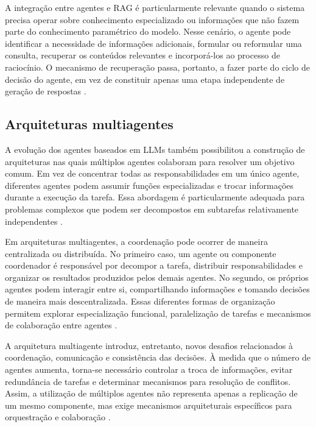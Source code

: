 A integração entre agentes e RAG é particularmente relevante quando o sistema precisa operar sobre conhecimento especializado ou informações que não fazem parte do conhecimento paramétrico do modelo. Nesse cenário, o agente pode identificar a necessidade de informações adicionais, formular ou reformular uma consulta, recuperar os conteúdos relevantes e incorporá-los ao processo de raciocínio. O mecanismo de recuperação passa, portanto, a fazer parte do ciclo de decisão do agente, em vez de constituir apenas uma etapa independente de geração de respostas \cite{lewis2020rag,zhao2026survey}.

\subsection{Arquiteturas multiagentes}

A evolução dos agentes baseados em LLMs também possibilitou a construção de arquiteturas nas quais múltiplos agentes colaboram para resolver um objetivo comum. Em vez de concentrar todas as responsabilidades em um único agente, diferentes agentes podem assumir funções especializadas e trocar informações durante a execução da tarefa. Essa abordagem é particularmente adequada para problemas complexos que podem ser decompostos em subtarefas relativamente independentes \cite{cheng2026,zhao2026survey}.

Em arquiteturas multiagentes, a coordenação pode ocorrer de maneira centralizada ou distribuída. No primeiro caso, um agente ou componente coordenador é responsável por decompor a tarefa, distribuir responsabilidades e organizar os resultados produzidos pelos demais agentes. No segundo, os próprios agentes podem interagir entre si, compartilhando informações e tomando decisões de maneira mais descentralizada. Essas diferentes formas de organização permitem explorar especialização funcional, paralelização de tarefas e mecanismos de colaboração entre agentes \cite{cheng2026,zhao2026survey}.

A arquitetura multiagente introduz, entretanto, novos desafios relacionados à coordenação, comunicação e consistência das decisões. À medida que o número de agentes aumenta, torna-se necessário controlar a troca de informações, evitar redundância de tarefas e determinar mecanismos para resolução de conflitos. Assim, a utilização de múltiplos agentes não representa apenas a replicação de um mesmo componente, mas exige mecanismos arquiteturais específicos para orquestração e colaboração \cite{cheng2026}.

